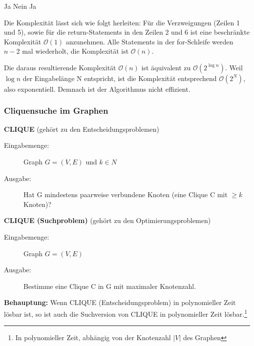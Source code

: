 \documentclass{article} %
\begin{document}
\begin{algorithmic}[1]
	 \State \Return Ja
	\Else {}
			\State \Return Nein
		\Else
		\EndIf
	\EndFor
	\State \Return Ja
	\EndIf
\end{algorithmic}

Die Komplexität lässt sich wie folgt herleiten:
Für die Verzweigungen (Zeilen 1 und 5), sowie für die return-Statements in den Zeilen 2 und 6 ist eine beschränkte Komplexität $\mathcal{O}(1)$ anzunehmen.
Alle Statements in der for-Schleife werden $n-2$ mal wiederholt, die Komplexität ist $\mathcal{O}(n)$.

Die daraus resultierende Komplexität $\mathcal{O}(n)$ ist äquivalent zu $\mathcal{O}(2^{\log n})$.
Weil $\log n$ der Eingabelänge N entspricht, ist die Komplexität entsprechend $\mathcal{O}(2^N)$, also exponentiell.
Demnach ist der Algorithmus nicht effizient.

\subsubsection{Cliquensuche im Graphen}

\begin{framed}
\textbf{CLIQUE}  {\tiny(gehört zu den Entscheidungsproblemen)}\\
\begin{description}
	\item[Eingabemenge:] Graph $G= (V,E)$ und $k \in N$
	\item[Ausgabe:] Hat G mindestens paarweise verbundene Knoten (eine Clique C mit $\geq k$ Knoten)?
\end{description} 
\end{framed}

\begin{framed}
\textbf{CLIQUE (Suchproblem)} {\tiny(gehört zu den Optimierungsproblemen)}\\
\begin{description}
	\item[Eingabemenge:] Graph $G= (V,E)$
	\item[Ausgabe:] Bestimme eine Clique C in G mit maximaler Knotenzahl.
\end{description} 
\end{framed}

\textbf{Behauptung:} Wenn CLIQUE (Entscheidungsproblem) in polynomieller Zeit lösbar ist, so ist auch die Suchversion von CLIQUE in polynomieller Zeit lösbar.\footnote{In polynomieller Zeit, abhängig von der Knotenzahl $|V|$ des Graphen}
\end{document}
